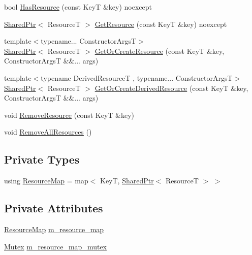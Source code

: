 \begin{DoxyCompactItemize}
\item 
bool \hyperlink{classmage_1_1_persistent_resource_pool_ad33abfe0eda43b4295ed6b9e7532f3c5}{Has\+Resource} (const KeyT \&key) noexcept
\item 
\hyperlink{namespacemage_a1e01ae66713838a7a67d30e44c67703e}{Shared\+Ptr}$<$ ResourceT $>$ \hyperlink{classmage_1_1_persistent_resource_pool_a1804dd33769dafbb50ebc14231eb793c}{Get\+Resource} (const KeyT \&key) noexcept
\item 
{\footnotesize template$<$typename... Constructor\+ArgsT$>$ }\\\hyperlink{namespacemage_a1e01ae66713838a7a67d30e44c67703e}{Shared\+Ptr}$<$ ResourceT $>$ \hyperlink{classmage_1_1_persistent_resource_pool_a595623bdabb20fd464ca448d7061e9aa}{Get\+Or\+Create\+Resource} (const KeyT \&key, Constructor\+ArgsT \&\&... args)
\item 
{\footnotesize template$<$typename Derived\+ResourceT , typename... Constructor\+ArgsT$>$ }\\\hyperlink{namespacemage_a1e01ae66713838a7a67d30e44c67703e}{Shared\+Ptr}$<$ ResourceT $>$ \hyperlink{classmage_1_1_persistent_resource_pool_a1423605c78293295129fde4afa18637a}{Get\+Or\+Create\+Derived\+Resource} (const KeyT \&key, Constructor\+ArgsT \&\&... args)
\item 
void \hyperlink{classmage_1_1_persistent_resource_pool_ab9f233a5510cf9dc35454b7f3b8b415f}{Remove\+Resource} (const KeyT \&key)
\item 
void \hyperlink{classmage_1_1_persistent_resource_pool_ae8b7a0b7d2f6adefc725d08367b8a29f}{Remove\+All\+Resources} ()
\end{DoxyCompactItemize}
\subsection*{Private Types}
\begin{DoxyCompactItemize}
\item 
using \hyperlink{classmage_1_1_persistent_resource_pool_a484a9df446865f7916d8fd2e560a3e18}{Resource\+Map} = map$<$ KeyT, \hyperlink{namespacemage_a1e01ae66713838a7a67d30e44c67703e}{Shared\+Ptr}$<$ ResourceT $>$ $>$
\end{DoxyCompactItemize}
\subsection*{Private Attributes}
\begin{DoxyCompactItemize}
\item 
\hyperlink{classmage_1_1_persistent_resource_pool_a484a9df446865f7916d8fd2e560a3e18}{Resource\+Map} \hyperlink{classmage_1_1_persistent_resource_pool_a9fec1e7492b5aea2a006b4e150289795}{m\+\_\+resource\+\_\+map}
\item 
\hyperlink{structmage_1_1_mutex}{Mutex} \hyperlink{classmage_1_1_persistent_resource_pool_acd393008aa9fcebf06daa5ba2b8cc073}{m\+\_\+resource\+\_\+map\+\_\+mutex}
\end{DoxyCompactItemize}


